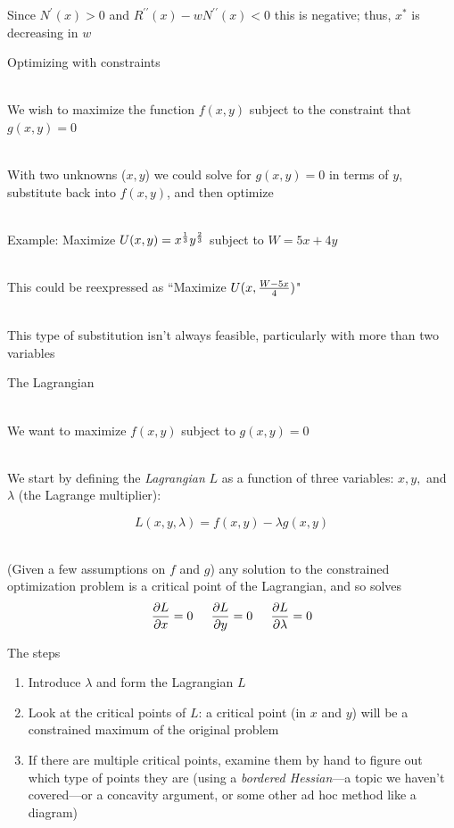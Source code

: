 \documentclass[10pt]{seminar}
\begin{document}
\begin{slide}
Since $N^\prime(x)>0$ and $R^{\prime\prime}(x)-wN^{\prime\prime}(x)<0$ this is negative; thus, $x^*$ is decreasing in $w$

\newslide
Optimizing with constraints

\ \\We wish to maximize the function $f(x, y)$ subject to the constraint that $g(x, y)=0$

\ \\With two unknowns ($x, y$) we could solve for $g(x, y)=0$ in terms of $y$, substitute back into $f(x, y)$, and then optimize

\ \\Example: Maximize $U(x, y)=x^{1\over 3}y^{2\over 3}$ subject to $W=5x+4y$

\ \\This could be reexpressed as ``Maximize $U(x, {{W-5x}\over 4})$"

\ \\This type of substitution isn't always feasible, particularly with more than two variables

\newslide
The Lagrangian

\ \\We want to maximize $f(x, y)$ subject to $g(x, y)=0$

\ \\We start by defining the \textit{Lagrangian} $L$ as a function of three variables: $x, y,$ and $ \lambda$ (the Lagrange multiplier):

$$L(x, y, \lambda)=f(x, y)-\lambda g(x, y)$$

\ \\(Given a few assumptions on $f$ and $g$) any solution to the constrained optimization problem is a critical point of the Lagrangian, and so solves
$$ {{\partial L}\over{\partial x}}=0 \hspace{.2in}  {{\partial L}\over{\partial y}}=0 \hspace{.2in}  {{\partial L}\over{\partial \lambda}}=0$$

\newslide

The steps

\begin{enumerate}
\item Introduce $\lambda$ and form the Lagrangian $L$

\item Look at the critical points of $L$: a critical point (in $x$ and $y$) will be a constrained maximum of the original problem
\item If there are multiple critical points, examine them by hand to figure out which type of points they are (using a \textit{bordered Hessian}---a topic we haven't covered---or a concavity argument, or some other ad hoc method like a diagram)


\end{enumerate}
\end{slide}
\end{document}
